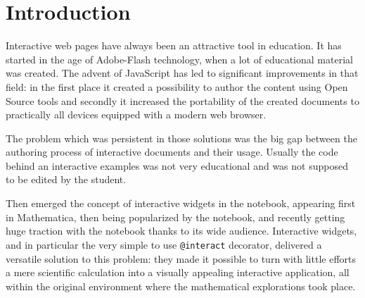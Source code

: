 \documentclass{deliverablereport}
\author{Marcin Kostur, Jerzy Łuczka, Jan Aksamit, Jolanta Marzec}
\begin{document}
\maketitle

\tableofcontents


\section{Introduction}

Interactive web pages have always been an attractive tool in
education. It has started in the age of Adobe-Flash technology, when a
lot of educational material was created. The advent of JavaScript has
led to significant improvements in that field: in the first place it
created a possibility to author the content using Open Source tools
and secondly it increased the portability of the created documents to
practically all devices equipped with a modern web browser.

The problem which was persistent in those solutions was the big gap
between the authoring process of interactive documents and their usage.
Usually the code behind an interactive examples was not very
educational and was not supposed to be edited by the student.

Then emerged the concept of interactive widgets in the notebook,
appearing first in Mathematica, then being popularized by the \Sage
notebook, and recently getting huge traction with the \Jupyter
notebook thanks to its wide audience. Interactive widgets, and in
particular the very simple to use \texttt{@interact} decorator,
delivered a versatile solution to this problem: they made it possible
to turn with little efforts a mere scientific calculation into a
visually appealing interactive application, all within the original
environment where the mathematical explorations took place.

\end{document}
